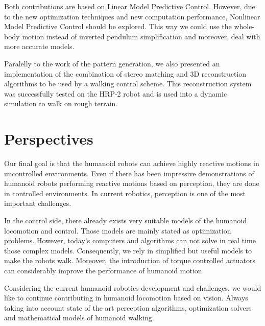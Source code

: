 Both contributions are based on Linear Model Predictive Control. However, due to the new optimization techniques and new computation performance, Nonlinear Model Predictive Control should be explored. This way we could use the whole-body motion instead of inverted pendulum simplification and moreover, deal with more accurate models.

Paralelly to the work of the pattern generation, we also presented an implementation of the combination of stereo matching and 3D reconstruction algorithms to be used by a walking control scheme. This reconstruction system was successfully tested on the HRP-2 robot and is used into a dynamic simulation to walk on rough terrain.

\section{Perspectives}

Our final goal is that the humanoid robots can achieve highly reactive motions in uncontrolled environments. Even if there has been impressive demonstrations of humanoid robots performing reactive motions based on perception, they are done in controlled environments. In current robotics, perception is one of the most important challenges.

In the control side, there already exists very suitable models of the humanoid locomotion and control. Those models are mainly stated as optimization problems. However, today's computers and algorithms can not solve in real time those complex models. Consequently, we rely in simplified but useful models to make the robots walk. Moreover, the introduction of torque controlled actuators can considerably improve the performance of humanoid motion.

Considering the current humanoid robotics development and challenges, we would like to continue contributing in humanoid locomotion based on vision. Always taking into account state of the art perception algorithms, optimization solvers and mathematical models of humanoid walking.

